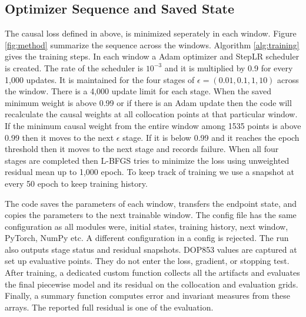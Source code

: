 \documentclass[conference]{IEEEtran}
\begin{document}
\subsection{Optimizer Sequence and Saved State}

The causal loss defined in above, is minimized seperately in each window. Figure \ref{fig:method}
summarize the sequence across the windows. Algorithm \ref{alg:training} gives the training steps. In each window a Adam optimizer and StepLR scheduler is created. The rate of the scheduler is $10^{-3}$ and it is multiplied by 0.9 for every 1,000 updates. It is maintained for the four stages of $\epsilon=(0.01,0.1,1,10)$ across the window. There is a 4,000 update limit for each stage. When the saved minimum weight is above 0.99 or if there is an Adam update then the code will recalculate the causal weights at all collocation points at that particular window. If the minimum causal weight from the entire window among 1535 points is above 0.99 then it moves to the next $\epsilon$ stage. If it is below 0.99 and it reaches the epoch threshold then it moves to the next stage and records failure. When all four stages are completed then L-BFGS tries to minimize the loss using unweighted residual mean up to 1,000 epoch. To keep track of training we use a snapshot at every 50 epoch to keep training history.

The code saves the parameters of each window, transfers the endpoint state, and copies the parameters to the next trainable window. The config file has the same configuration as all modules were, initial states, training history, next window, PyTorch, NumPy etc. A different configuration in a config is rejected. The run also outputs stage status and residual snapshots. DOP853 values are captured at set up evaluative points. They do not enter the loss, gradient, or stopping test. After training, a dedicated custom function collects all the artifacts and evaluates the final piecewise model and its residual on the collocation and evaluation grids. Finally, a summary function computes error and invariant measures from these arrays. The reported full residual is one of the evaluation.
\end{document}
